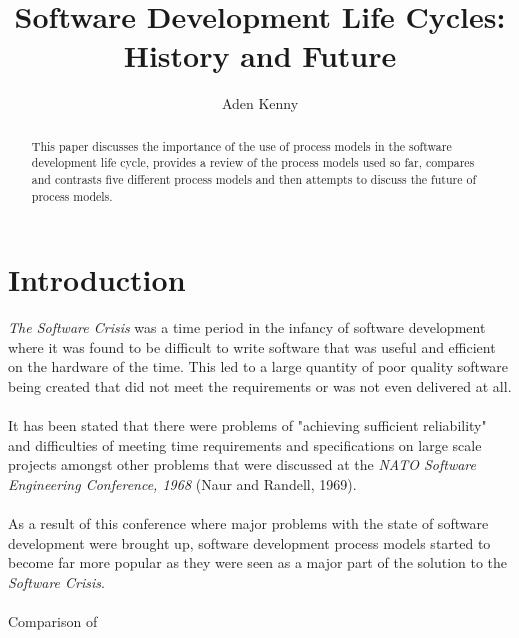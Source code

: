 \documentclass{CRPITStyle}
\begin{document}
	\title {Software Development Life Cycles: History and Future}
	\author {Aden Kenny}
	\maketitle

	\begin {abstract} 
		This paper discusses the importance of the use of process models in the software development life cycle, provides a
		review of the process models used so far, compares and contrasts five different process models and then attempts to
		discuss the future of process models.
	\end {abstract}

	
	\section {Introduction} 
		\textit{The Software Crisis} was a time period in the infancy of software development where it was found to be difficult 
		to write software that was useful and efficient on the hardware of the time. This led to a large quantity of poor quality
		software being created that did not meet the requirements or was not even delivered at all.\\
		~\\
		It has been stated that there were problems of "achieving sufficient reliability" and difficulties of meeting time
		requirements and specifications on large scale projects amongst other problems that were discussed at the \textit{NATO
		Software Engineering Conference, 1968} (Naur and Randell, 1969).\\
		~\\
		As a result of this conference where major problems with the state of software development were brought up, software
		development process models started to become far more popular as they were seen as a major part of the solution to the
		\textit{Software Crisis}.\\
~\\
Comparison of 
\end{document}
